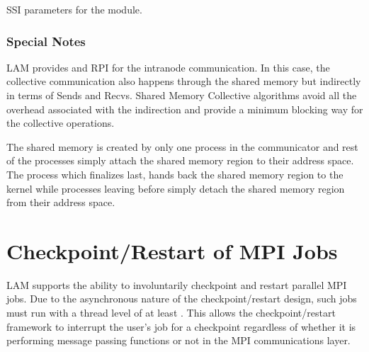 \begin{table}[htbp]
  \begin{ssiparamtb}
%
%
  \end{ssiparamtb}
  \caption{SSI parameters for the   module.}
  \label{tbl:mpi-ssi-shmem-ssi-params}
\end{table}


\subsubsection{Special Notes}

LAM provides  and  RPI for the intra\-node
communication.  In this case, the collective communication also
happens through the shared memory but indirectly in terms of Sends and
Recvs.  Shared Memory Collective algorithms avoid all the overhead
associated with the indirection and provide a minimum blocking way for
the collective operations.

The shared memory is created by only one process in the communicator
and rest of the processes simply attach the shared memory region to
their address space.  The process which finalizes last, hands back the
shared memory region to the kernel while processes leaving before
simply detach the shared memory region from their address space. 




\section{Checkpoint/Restart of MPI Jobs}
\label{sec:mpi-ssi-cr}

LAM supports the ability to involuntarily checkpoint and restart
parallel MPI jobs.  Due to the asynchronous nature of the
checkpoint/restart design, such jobs must run with a thread level of
at least .  This allows the
checkpoint/restart framework to interrupt the user's job for a
checkpoint regardless of whether it is performing message passing
functions or not in the MPI communications layer.

